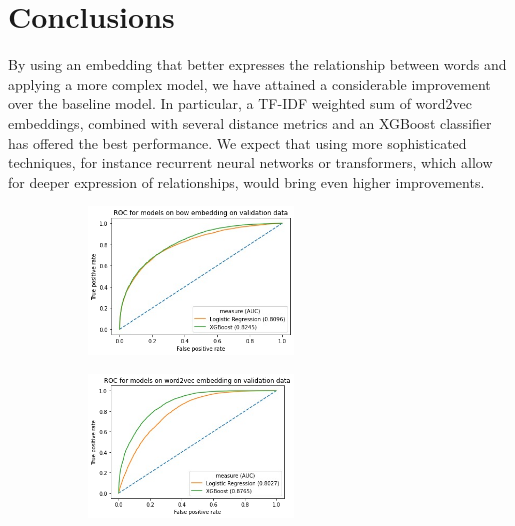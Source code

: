 \documentclass[11pt,a4paper]{article}
\begin{document}
\section{Conclusions}

By using an embedding that better expresses the relationship between words and applying a more complex model, we have attained a considerable improvement over the baseline model. In particular, a TF-IDF weighted sum of word2vec embeddings, combined with several distance metrics and an XGBoost classifier has offered the best performance. We expect that using more sophisticated techniques, for instance recurrent neural networks or transformers, which allow for deeper expression of relationships, would bring even higher improvements.

\begin{figure}[H]
    \centering
    \begin{subfigure}[b]{\textwidth}
        \centering
         \includegraphics[width=0.6\textwidth]{img/roc_clf_bow}
    \end{subfigure}
    \hfill
    \begin{subfigure}[b]{\textwidth}
        \centering
         \includegraphics[width=0.6\textwidth]{img/roc_clf_w2v}
    \end{subfigure}
    \hfill
    \begin{subfigure}[b]{\textwidth}
        \centering

\end{subfigure}
\end{figure}
\end{document}
